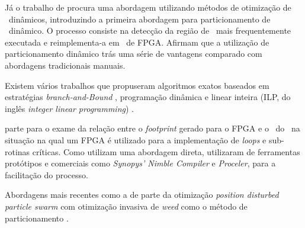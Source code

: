    Já o trabalho de \citet{Stitt2003} procura uma abordagem utilizando métodos de otimização de \software\ dinâmicos, introduzindo a primeira abordagem para particionamento de \hs\ dinâmico.
   O processo consiste na detecção da região de \software\ mais frequentemente executada e reimplementa-a em \hardware\ de FPGA.
   Afirmam que a utilização de particionamento dinâmico trás uma série de vantagens comparado com abordagens tradicionais manuais.
   
   Existem vários trabalhos que propuseram algoritmos exatos baseados em estratégias \textit{branch-and-Bound} \citep{Jigang2004, Mann2007, Strachacki2008}, programação dinâmica \citep{Madsen1997, Wu2006} e linear inteira (ILP, do inglês \textit{integer linear programming}) \citep{Niemann1997}.
   
   \citet{Nematbakhsh_theeffect} parte para o exame da relação entre o \textit{footprint} gerado para o FPGA e o \speedup\ do \software\ na situação na qual um FPGA é utilizado para a implementação de \textit{loops} e sub-rotinas críticas.
   Como utilizam uma abordagem direta, utilizaram de ferramentas protótipos e comerciais como \textit{Synopys' Nimble Compiler} e \textit{Proceler}, para a facilitação do processo.
   
   Abordagens mais recentes como a de \citet{Yan2017} parte da otimização \textit{position disturbed particle swarm} com otimização invasiva de \textit{weed} como o método de particionamento \hs.
   
